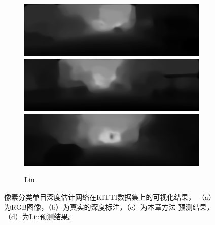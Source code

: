 \begin{figure}[htb]
\begin{subfigure}{0.24\linewidth}
\begin{minipage}[b]{1\linewidth}
  \includegraphics[width=1\linewidth]{figure/Pixel_cla_kitti/2eigen.png}\vspace{3.5pt}
  \includegraphics[width=1\linewidth]{figure/Pixel_cla_kitti/3eigen.png}\vspace{3.5pt}
  \includegraphics[width=1\linewidth]{figure/Pixel_cla_kitti/4eigen.png}
  \end{minipage}
  \caption{Liu\cite{liu2015learning}}
  \end{subfigure}
  \caption{像素分类单目深度估计网络在KITTI数据集上的可视化结果，
  （a）为RGB图像，（b）为真实的深度标注，（c）为本章方法
  预测结果，（d）为Liu\cite{liu2015learning}预测结果。}
  \label{Pixel_cla_KITTI_visualization_result}
  \end{figure}

